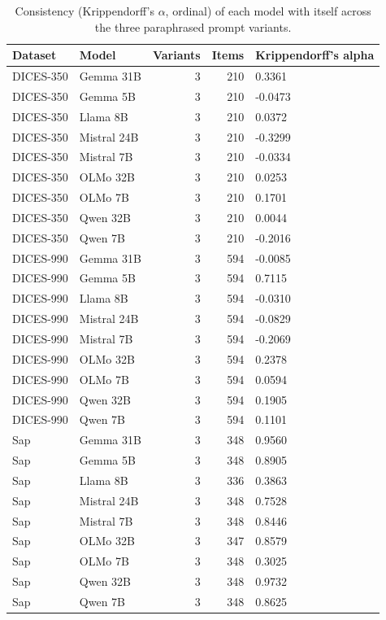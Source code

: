 \begin{table}[t]
\centering
\caption{Consistency (Krippendorff's $\alpha$, ordinal) of each model with itself across the three paraphrased prompt variants.}
\label{tab:llm-consistency-variants}
\begin{tabular}{llrrl}
\toprule
Dataset & Model & Variants & Items & Krippendorff's alpha \\
\midrule
DICES-350 & Gemma 31B & 3 & 210 & 0.3361 \\
DICES-350 & Gemma 5B & 3 & 210 & -0.0473 \\
DICES-350 & Llama 8B & 3 & 210 & 0.0372 \\
DICES-350 & Mistral 24B & 3 & 210 & -0.3299 \\
DICES-350 & Mistral 7B & 3 & 210 & -0.0334 \\
DICES-350 & OLMo 32B & 3 & 210 & 0.0253 \\
DICES-350 & OLMo 7B & 3 & 210 & 0.1701 \\
DICES-350 & Qwen 32B & 3 & 210 & 0.0044 \\
DICES-350 & Qwen 7B & 3 & 210 & -0.2016 \\
DICES-990 & Gemma 31B & 3 & 594 & -0.0085 \\
DICES-990 & Gemma 5B & 3 & 594 & 0.7115 \\
DICES-990 & Llama 8B & 3 & 594 & -0.0310 \\
DICES-990 & Mistral 24B & 3 & 594 & -0.0829 \\
DICES-990 & Mistral 7B & 3 & 594 & -0.2069 \\
DICES-990 & OLMo 32B & 3 & 594 & 0.2378 \\
DICES-990 & OLMo 7B & 3 & 594 & 0.0594 \\
DICES-990 & Qwen 32B & 3 & 594 & 0.1905 \\
DICES-990 & Qwen 7B & 3 & 594 & 0.1101 \\
Sap & Gemma 31B & 3 & 348 & 0.9560 \\
Sap & Gemma 5B & 3 & 348 & 0.8905 \\
Sap & Llama 8B & 3 & 336 & 0.3863 \\
Sap & Mistral 24B & 3 & 348 & 0.7528 \\
Sap & Mistral 7B & 3 & 348 & 0.8446 \\
Sap & OLMo 32B & 3 & 347 & 0.8579 \\
Sap & OLMo 7B & 3 & 348 & 0.3025 \\
Sap & Qwen 32B & 3 & 348 & 0.9732 \\
Sap & Qwen 7B & 3 & 348 & 0.8625 \\

\end{tabular}
\end{table}
